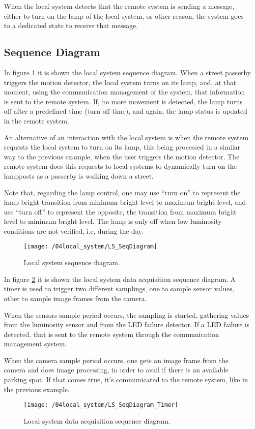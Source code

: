 When the local system detects that the remote system is sending a message, either to turn on the lamp of the local system, or other reason, the system goes to a dedicated state to receive that message.

\subsection{Sequence Diagram}
In figure \ref{fig:ls_seq_diagram} it is shown the local system sequence diagram. When a street passerby triggers the motion detector, the local system turns on its lamp, and, at that moment, using the communication management of the system, that information is sent to the remote system. If, no more movement is detected, the lamp turns off after a predefined time (turn off time), and again, the lamp status is updated in the remote system.

An alternative of an interaction with the local system is when the remote system requests the local system to turn on its lamp, this being processed in a similar way to the previous example, when the user triggers the motion detector. The remote system does this requests to local systems to dynamically turn on the lampposts as a passerby is walking down a street.

Note that, regarding the lamp control, one may use “turn on” to represent the lamp bright transition from minimum bright level to maximum bright level, and use “turn off” to represent the opposite, the transition from maximum bright level to minimum bright level. The lamp is only off when low luminosity conditions are not verified, i.e, during the day.

\begin{figure}[H]
	\centering
	\texttt{[image: /04local\_system/LS\_SeqDiagram]}
	\caption{Local system sequence diagram.}
	\label{fig:ls_seq_diagram}
\end{figure}

\clearpage
In figure \ref{fig:ls_seq_diagram_timer} it is shown the local system data acquisition sequence diagram. A timer is used to trigger two different samplings, one to sample sensor values, other to sample image frames from the camera. 

When the sensors sample period occurs, the sampling is started, gathering values from the luminosity sensor and from the LED failure detector. If a LED failure is detected, that is sent to the remote system through the communication management system.

When the camera sample period occurs, one gets an image frame from the camera and does image processing, in order to avail if there is an available parking spot. If that comes true, it's communicated to the remote system, like in the previous example.

\begin{figure}[H]
	\centering
	\texttt{[image: /04local\_system/LS\_SeqDiagram\_Timer]}
	\caption{Local system data acquisition sequence diagram.}
	\label{fig:ls_seq_diagram_timer}
\end{figure}
